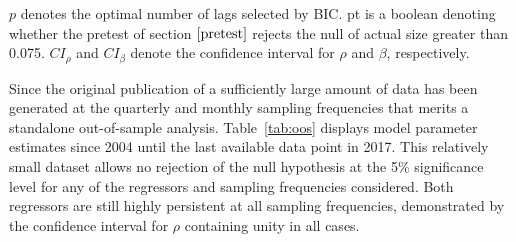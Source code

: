 \documentclass{article}
\begin{document}
\begin{table}[h!]
\begin{threeparttable}
\begin{tablenotes}
$p$ denotes the optimal number of lags selected by BIC. pt is a boolean denoting whether the pretest of section $\ref{pretest}$ rejects the null of actual size greater than 0.075. $CI_{\rho}$ and $CI_{\beta}$ denote the confidence interval for $\rho$ and $\beta$, respectively.
\end{tablenotes}
\end{threeparttable}
\end{table}

Since the original publication of \citet{campbell2006efficient} a sufficiently large amount of data has been generated at the quarterly and monthly sampling frequencies that merits a standalone out-of-sample analysis. Table~\vref{tab:oos} displays model parameter estimates since 2004 until the last available data point in 2017. This relatively small dataset allows no rejection of the null hypothesis at the 5\% significance level for any of the regressors and sampling frequencies considered. Both regressors are still highly persistent at all sampling frequencies, demonstrated by the confidence interval for $\rho$ containing unity in all cases. 
\end{document}
